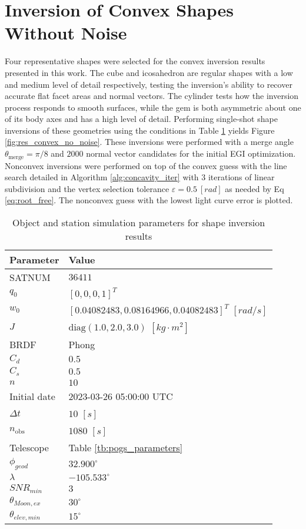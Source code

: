 \clearpage
\section{Inversion of Convex Shapes Without Noise}

Four representative shapes were selected for the convex inversion results presented in this work. The cube and icosahedron are regular shapes with a low and medium level of detail respectively, testing the inversion's ability to recover accurate flat facet areas and normal vectors. The cylinder tests how the inversion process responds to smooth surfaces, while the gem is both asymmetric about one of its body axes and has a high level of detail. Performing single-shot shape inversions of these geometries using the conditions in Table \ref{tb:cvx_props} yields Figure \ref{fig:res_convex_no_noise}. These inversions were performed with a merge angle $\theta_\mathrm{merge} = \pi / 8$ and $2000$ normal vector candidates for the initial EGI optimization. Nonconvex inversions were performed on top of the convex guess with the line search detailed in Algorithm \ref{alg:concavity_iter} with $3$ iterations of linear subdivision and the vertex selection tolerance $\varepsilon = 0.5 \: [rad]$ as needed by Eq \ref{eq:root_free}. The nonconvex guess with the lowest light curve error is plotted.

\begin{table}[]
  \centering
  \begin{tabular}{|l|l|}
  \hline
  \textbf{Parameter} & \textbf{Value} \\ \hline
  SATNUM & $36411$ \\ \hline
  $q_0$ & $\left[ 0, 0, 0, 1 \right]^T$ \\ \hline
  $w_0$ & $\left[ 0.04082483, 0.08164966, 0.04082483 \right]^T$ $[rad/s]$ \\ \hline
  $J$ & $\mathrm{diag}\left( 1.0, 2.0, 3.0 \right)$ $\left[ kg \cdot m^2 \right]$ \\ \hline
  BRDF & Phong \\ \hline
  $C_d$ & $0.5$ \\ \hline
  $C_s$ & $0.5$ \\ \hline
  $n$ & $10$ \\ \hline
  Initial date & 2023-03-26 05:00:00 UTC \\ \hline
  $\Delta t$ & $10$ $[s]$ \\ \hline
  $n_\mathrm{obs}$ & $1080$ $[s]$ \\ \hline
  Telescope & Table \ref{tb:pogs_parameters} \\ \hline
  $\phi_{geod}$ & $32.900^\circ$ \\ \hline
  $\lambda$ & $-105.533^\circ$ \\ \hline
  $SNR_{min}$ & $3$ \\ \hline
  $\theta_{Moon,ex}$ & $30^\circ$ \\ \hline
  $\theta_{elev,min}$ & $15^\circ$ \\ \hline
  \end{tabular}
  \caption{Object and station simulation parameters for shape inversion results}
  \label{tb:cvx_props}
\end{table}

